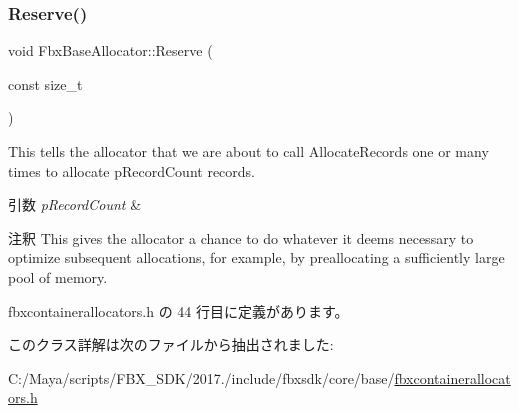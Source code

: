 \subsubsection{\texorpdfstring{Reserve()}{Reserve()}}
{\footnotesize\ttfamily void Fbx\+Base\+Allocator\+::\+Reserve (\begin{DoxyParamCaption}\item[{const size\+\_\+t}]{ }\end{DoxyParamCaption})\hspace{0.3cm}{\ttfamily [inline]}}

This tells the allocator that we are about to call Allocate\+Records one or many times to allocate p\+Record\+Count records. 
\begin{DoxyParams}{引数}
{\em p\+Record\+Count} & \\
\hline
\end{DoxyParams}
\begin{DoxyRemark}{注釈}
This gives the allocator a chance to do whatever it deems necessary to optimize subsequent allocations, for example, by preallocating a sufficiently large pool of memory. 
\end{DoxyRemark}


 fbxcontainerallocators.\+h の 44 行目に定義があります。



このクラス詳解は次のファイルから抽出されました\+:\begin{DoxyCompactItemize}
\item 
C\+:/\+Maya/scripts/\+F\+B\+X\+\_\+\+S\+D\+K/2017./include/fbxsdk/core/base/\hyperlink{fbxcontainerallocators_8h}{fbxcontainerallocators.\+h}\end{DoxyCompactItemize}
